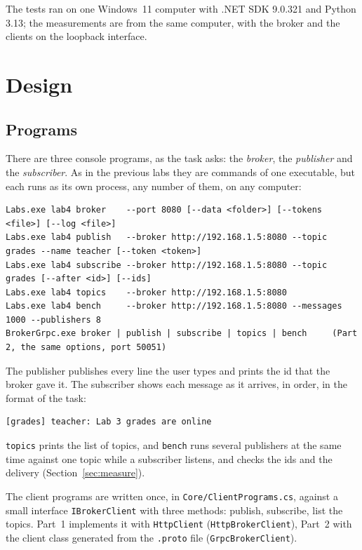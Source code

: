 \documentclass[11pt,a4paper]{article}
\newcommand{\code}[1]{{\frenchspacing\texttt{#1}}}
\begin{document}
The tests ran on one Windows~11 computer with .NET SDK 9.0.321 and Python 3.13; the measurements are
from the same computer, with the broker and the clients on the loopback interface.

\section{Design}

\subsection{Programs}

There are three console programs, as the task asks: the \emph{broker}, the \emph{publisher} and the
\emph{subscriber}. As in the previous labs they are commands of one executable, but each runs as its
own process, any number of them, on any computer:

\begin{lstlisting}
Labs.exe lab4 broker    --port 8080 [--data <folder>] [--tokens <file>] [--log <file>]
Labs.exe lab4 publish   --broker http://192.168.1.5:8080 --topic grades --name teacher [--token <token>]
Labs.exe lab4 subscribe --broker http://192.168.1.5:8080 --topic grades [--after <id>] [--ids]
Labs.exe lab4 topics    --broker http://192.168.1.5:8080
Labs.exe lab4 bench     --broker http://192.168.1.5:8080 --messages 1000 --publishers 8
BrokerGrpc.exe broker | publish | subscribe | topics | bench     (Part 2, the same options, port 50051)
\end{lstlisting}

The publisher publishes every line the user types and prints the id that the broker gave it. The
subscriber shows each message as it arrives, in order, in the format of the task:

\begin{lstlisting}
[grades] teacher: Lab 3 grades are online
\end{lstlisting}

\code{topics} prints the list of topics, and \code{bench} runs several publishers at the same time
against one topic while a subscriber listens, and checks the ids and the delivery
(Section~\ref{sec:measure}).

The client programs are written once, in \code{Core/ClientPrograms.cs}, against a small interface
\code{IBrokerClient} with three methods: publish, subscribe, list the topics. Part~1 implements it
with \code{HttpClient} (\code{HttpBrokerClient}), Part~2 with the client class generated from the
\code{.proto} file (\code{GrpcBrokerClient}).
\end{document}

